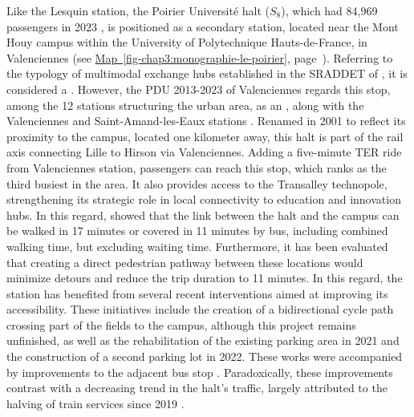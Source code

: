 \begin{refsegment}
Like the Lesquin station, the Poirier Université halt (\(S_8\)), which had 84,969 passengers in 2023 \textcolor{blue}{\autocite{sncf_frequentation_2024}}, is positioned as a secondary station, located near the Mont Houy campus within the University of Polytechnique Hauts-de-France, in Valenciennes (see \hyperref[fig-chap3:monographie-le-poirier]{Map~\ref{fig-chap3:monographie-le-poirier}}, page~\pageref{fig-chap3:monographie-le-poirier}). Referring to the typology of multimodal exchange hubs established in the \acrshort{SRADDET} of \textcolor{blue}{\textcite[83]{region_hauts-de-france_sraddet_2024}}, it is considered a . However, the \acrshort{PDU} 2013-2023 of Valenciennes regards this stop, among the 12 stations structuring the urban area, as an , along with the Valenciennes and Saint-Amand-les-Eaux stations \textcolor{blue}{\autocite[43-44]{siturv_plan_2014}}. Renamed in 2001 to reflect its proximity to the campus, located one kilometer away, this halt is part of the rail axis connecting Lille to Hirson via Valenciennes. Adding a five-minute \acrshort{TER} ride from Valenciennes station, passengers can reach this stop, which ranks as the third busiest in the area. It also provides access to the Transalley technopole, strengthening its strategic role in local connectivity to education and innovation hubs. In this regard, \textcolor{blue}{\textcite[52]{lhostis_cadencement_2001}} showed that the link between the halt and the campus can be walked in 17 minutes or covered in 11 minutes by bus, including combined walking time, but excluding waiting time. Furthermore, it has been evaluated that creating a direct pedestrian pathway between these locations would minimize detours and reduce the trip duration to 11 minutes. In this regard, the station has benefited from several recent interventions aimed at improving its accessibility. These initiatives include the creation of a bidirectional cycle path crossing part of the fields to the campus, although this project remains unfinished, as well as the rehabilitation of the existing parking area in 2021 and the construction of a second parking lot in 2022. These works were accompanied by improvements to the adjacent bus stop \textcolor{blue}{\autocite{delattre_gros_2020}}. Paradoxically, these improvements contrast with a decreasing trend in the halt's traffic, largely attributed to the halving of train services since 2019 \textcolor{blue}{\autocite{verdonckt_pourquoi_2023}}.%


\end{refsegment}
